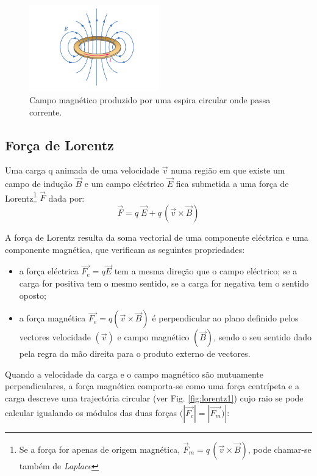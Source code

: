 \documentclass[a4paper,twoside,11pt]{report}      %
\begin{document}
 \begin{figure}[h]
  \centering 
\includegraphics[width=0.5\textwidth]{fig-espira.pdf}
\caption{Campo magnético produzido por uma espira circular onde passa corrente.}
\label{fig:espira1}
\end{figure}

\subsection{\sf Força de Lorentz }
Uma carga q animada de uma velocidade $\vec{v}$ numa região em que existe um campo de indução $\vec{B}$ e um campo eléctrico $\vec{E}$ fica submetida a uma força de Lorentz\footnote{Se a força for apenas de origem magnética, $\vec{F}_m =  q\,(\vec{v} \times \vec{B})$, pode chamar-se também de \emph{Laplace}} $\vec{F}$ dada por:
\begin{equation}
	\label{eq:Lorentz}
 \vec{F} = q\; \vec{E} + q\,(\vec{v} \times \vec{B})
\end{equation}

A força de Lorentz resulta da soma vectorial de uma componente eléctrica e uma componente magnética, que verificam as seguintes propriedades:
\begin{itemize}
\item a força eléctrica $\vec{F_e}=q\vec{E}$ tem a mesma direção que o campo eléctrico; se a carga for positiva tem o mesmo sentido, se a carga for negativa tem o sentido oposto;
\item a força magnética $\vec{F_e}=q(\vec{v} \times \vec{B})$ é perpendicular ao plano definido pelos vectores velocidade $(\vec{v})$ e campo magnético $(\vec{B})$, sendo o seu sentido dado pela regra da mão direita para o produto externo de vectores.
\end{itemize}
Quando a velocidade da carga e o campo magnético são mutuamente perpendiculares, a força magnética comporta-se como uma força centrípeta e a carga descreve uma trajectória circular (ver Fig. \ref{fig:lorentz1}) cujo raio se pode calcular igualando os módulos das duas forças $(|\vec{F_c}|=|\vec{F_m})|$:
\end{document}
